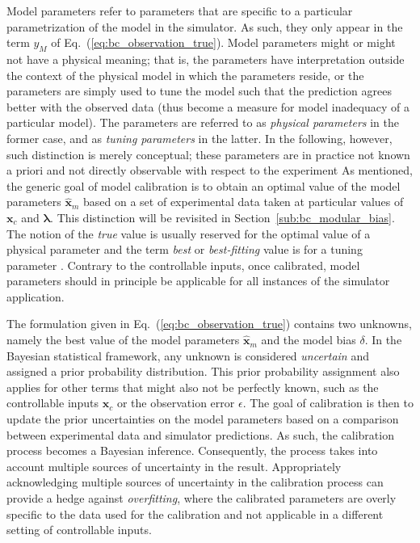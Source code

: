 Model parameters refer to parameters that are specific to a particular parametrization of the model in the simulator.
As such, they only appear in the term $y_M$ of Eq.~(\ref{eq:bc_observation_true}).
Model parameters might or might not have a physical meaning;
that is, the parameters have interpretation outside the context of the physical model in which the parameters reside, or the parameters are simply used to tune the model such that the prediction agrees better with the observed data (thus become a measure for model inadequacy of a particular model).
The parameters are referred to as \emph{physical parameters} in the former case,
and as \emph{tuning parameters} in the latter.
In the following, however, such distinction is merely conceptual;
these parameters are in practice not known a priori and not directly observable with respect to the experiment 
As mentioned, the generic goal of model calibration is to obtain an optimal value of the model parameters $\hat{\bm{x}}_m$ based on a set of experimental data taken at particular values of $\bm{x}_c$ and $\bm{\lambda}$.
This distinction will be revisited in Section~\ref{sub:bc_modular_bias}.
The notion of the \emph{true} value is usually reserved for the optimal value of a physical parameter \cite{OHagan2013} and the term \emph{best} or \emph{best-fitting} value is for a tuning parameter \cite{Bayarri2007}.
Contrary to the controllable inputs, once calibrated, model parameters should in principle be applicable for all instances of the simulator application.

The formulation given in Eq.~(\ref{eq:bc_observation_true}) contains two unknowns, namely the best value of the model parameters $\hat{\bm{x}}_m$ and the model bias $\delta$.
In the Bayesian statistical framework, any unknown is considered \emph{uncertain} and assigned a prior probability distribution.
This prior probability assignment also applies for other terms that might also not be perfectly known, such as the controllable inputs $\bm{x}_c$ or the observation error $\epsilon$. 
The goal of calibration is then to update the prior uncertainties on the model parameters based on a comparison between experimental data and simulator predictions.
As such, the calibration process becomes a Bayesian inference.
Consequently, the process takes into account multiple sources of uncertainty in the result.
Appropriately acknowledging multiple sources of uncertainty in the calibration process can provide a hedge against \emph{overfitting}, where the calibrated parameters are overly specific to the data used for the calibration and not applicable in a different setting of controllable inputs.

